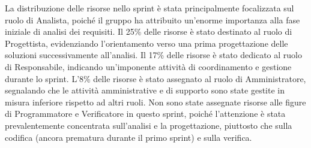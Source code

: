 La distribuzione delle risorse nello sprint è stata principalmente focalizzata sul ruolo di Analista, poiché il gruppo ha attribuito 
un'enorme importanza alla fase iniziale di analisi dei requisiti.
Il 25\% delle risorse è stato destinato al ruolo di Progettista, evidenziando l'orientamento verso una prima progettazione delle soluzioni 
successivamente all'analisi.
Il 17\% delle risorse è stato dedicato al ruolo di Responsabile, indicando un'imponente attività di coordinamento e gestione durante lo 
sprint.
L'8\% delle risorse è stato assegnato al ruolo di Amministratore, segnalando che le attività amministrative e di supporto sono state gestite
 in misura inferiore rispetto ad altri ruoli.
Non sono state assegnate risorse alle figure di Programmatore e Verificatore in questo sprint, poiché l'attenzione è stata prevalentemente 
concentrata sull'analisi e la progettazione, piuttosto che sulla codifica (ancora prematura durante il primo sprint) e sulla verifica.








